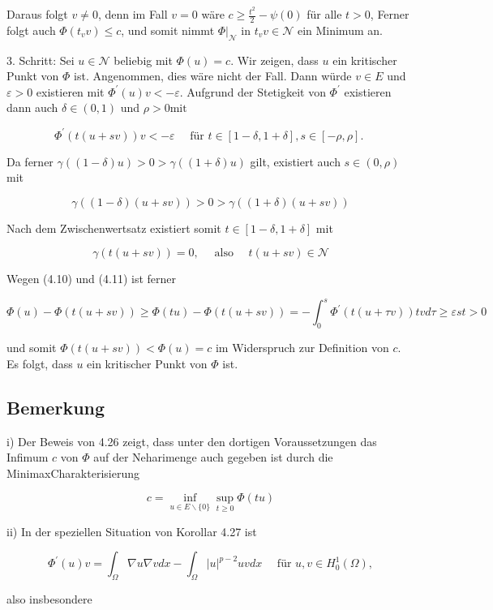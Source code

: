 \documentclass[10pt, letterpaper]{article}
\begin{document}
Daraus folgt $v \neq 0$, denn im Fall $v=0$ wäre $c \geq \frac{t^{2}}{2}-\psi(0)$ für alle $t>0$, Ferner folgt auch $\Phi\left(t_{v} v\right) \leq c$, und somit nimmt $\left.\Phi\right|_{\mathcal{N}}$ in $t_{v} v \in \mathcal{N}$ ein Minimum an.

3. Schritt: Sei $u \in \mathcal{N}$ beliebig mit $\Phi(u)=c$. Wir zeigen, dass $u$ ein kritischer Punkt von $\Phi$ ist. Angenommen, dies wäre nicht der Fall. Dann würde $v \in E$ und $\varepsilon>0$ existieren mit $\Phi^{\prime}(u) v<-\varepsilon$. Aufgrund der Stetigkeit von $\Phi^{\prime}$ existieren dann auch $\delta \in(0,1)$ und $\rho>0 \mathrm{mit}$

$$
\Phi^{\prime}(t(u+s v)) v<-\varepsilon \quad \text { für } t \in[1-\delta, 1+\delta], s \in[-\rho, \rho] \text {. }
$$

Da ferner $\gamma((1-\delta) u)>0>\gamma((1+\delta) u)$ gilt, existiert auch $s \in(0, \rho)$ mit

$$
\gamma((1-\delta)(u+s v))>0>\gamma((1+\delta)(u+s v))
$$

Nach dem Zwischenwertsatz existiert somit $t \in[1-\delta, 1+\delta]$ mit

$$
\gamma(t(u+s v))=0, \quad \text { also } \quad t(u+s v) \in \mathcal{N}
$$

Wegen (4.10) und (4.11) ist ferner

$$
\Phi(u)-\Phi(t(u+s v)) \geq \Phi(t u)-\Phi(t(u+s v))=-\int_{0}^{s} \Phi^{\prime}(t(u+\tau v)) t v d \tau \geq \varepsilon s t>0
$$

und somit $\Phi(t(u+s v))<\Phi(u)=c$ im Widerspruch zur Definition von $c$. Es folgt, dass $u$ ein kritischer Punkt von $\Phi$ ist.

\subsection*{Bemerkung}

i) Der Beweis von 4.26 zeigt, dass unter den dortigen Voraussetzungen das Infimum $c$ von $\Phi$ auf der Neharimenge auch gegeben ist durch die MinimaxCharakterisierung

$$
c=\inf _{u \in E \backslash\{0\}} \sup _{t \geq 0} \Phi(t u)
$$

ii) In der speziellen Situation von Korollar 4.27 ist

$$
\Phi^{\prime}(u) v=\int_{\Omega} \nabla u \nabla v d x-\int_{\Omega}|u|^{p-2} u v d x \quad \text { für } u, v \in H_{0}^{1}(\Omega),
$$

also insbesondere
\end{document}
